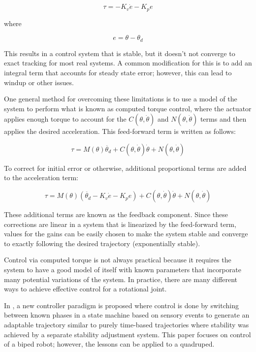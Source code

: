 \begin{equation}
\tau = -K_{v} \dot{e} - K_{p} e
\end{equation}

where

\begin{equation}
e = \theta - \theta_{d}
\end{equation}

This results in a control system that is stable, but it doesn't not converge to
exact tracking for most real systems. A common modification for this is to add
an integral term that accounts for steady state error; however, this can lead to
windup or other issues.

One general method for overcoming these limitations is to use a model of the 
system to perform what is known as computed torque control, where the actuator
applies enough torque to account for the $C(\theta, \dot{\theta})$ and
$N(\theta, \dot{\theta})$ terms and then applies the desired acceleration. This feed-forward term is written as follows:

\begin{equation}
\tau = M(\theta) \ddot{\theta_{d}} + C(\theta, \dot{\theta}) \dot{\theta} + N(\theta, \dot{\theta})
\end{equation}

To correct for initial error or otherwise, additional proportional terms are
added to the acceleration term:

\begin{equation}
\tau = M(\theta) (\ddot{\theta_{d}} - K_{v} \dot{e} - K_{p} e) + C(\theta, \dot{\theta}) \dot{\theta} + N(\theta, \dot{\theta})
\end{equation}

These additional terms are known as the feedback component. Since these 
corrections are linear in a system that is linearized by the feed-forward term,
values for the gains can be easily chosen to make the system stable and converge
to exactly following the desired trajectory (exponentially stable). \cite{MLS94}

Control via computed torque 
is not always practical because it requires the system to have a good model of 
itself with known parameters that incorporate many potential variations of the
system. In practice, 
there are many different ways to achieve effective control for a rotational 
joint.


In \cite{EventBasedWalking}, a new controller paradigm is proposed where control
is done by switching between known phases in a state machine based on sensory
events to generate an adaptable trajectory similar to purely time-based
trajectories where stability was achieved by a separate stability adjustment
system. This paper focuses on control of a biped robot; however, the lessons can
be applied to a quadruped.


